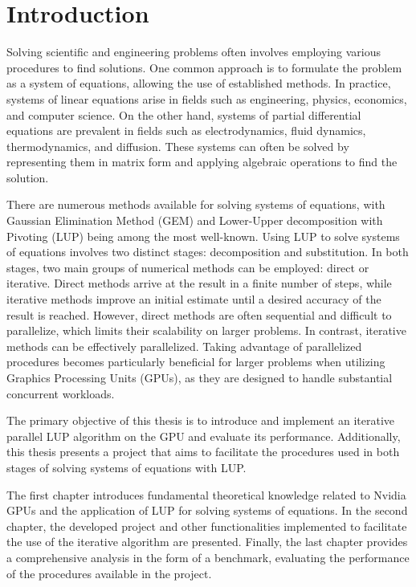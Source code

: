 \chapter*{Introduction}		 		 		 %

Solving scientific and engineering problems often involves employing various procedures to find solutions. One common approach is to formulate the problem as a system of equations, allowing the use of established methods. In practice, systems of linear equations arise in fields such as engineering, physics, economics, and computer science. On the other hand, systems of partial differential equations are prevalent in fields such as electrodynamics, fluid dynamics, thermodynamics, and diffusion. These systems can often be solved by representing them in matrix form and applying algebraic operations to find the solution.

There are numerous methods available for solving systems of equations, with Gaussian Elimination Method (GEM) and Lower-Upper decomposition with Pivoting (LUP) being among the most well-known. Using LUP to solve systems of equations involves two distinct stages: decomposition and substitution. In both stages, two main groups of numerical methods can be employed: direct or iterative. Direct methods arrive at the result in a finite number of steps, while iterative methods improve an initial estimate until a desired accuracy of the result is reached. However, direct methods are often sequential and difficult to parallelize, which limits their scalability on larger problems. In contrast, iterative methods can be effectively parallelized. Taking advantage of parallelized procedures becomes particularly beneficial for larger problems when utilizing Graphics Processing Units (GPUs), as they are designed to handle substantial concurrent workloads.

The primary objective of this thesis is to introduce and implement an iterative parallel LUP algorithm on the GPU and evaluate its performance. Additionally, this thesis presents a project that aims to facilitate the procedures used in both stages of solving systems of equations with LUP.

The first chapter introduces fundamental theoretical knowledge related to Nvidia GPUs and the application of LUP for solving systems of equations. In the second chapter, the developed project and other functionalities implemented to facilitate the use of the iterative algorithm are presented. Finally, the last chapter provides a comprehensive analysis in the form of a benchmark, evaluating the performance of the procedures available in the project.